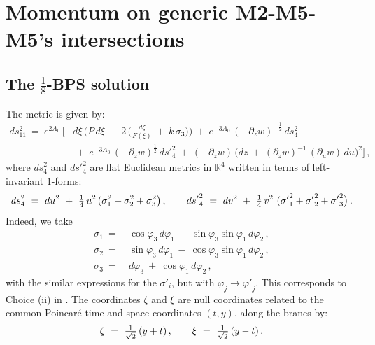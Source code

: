 \documentclass[11pt]{article}
\def\coeff#1#2{\relax{\textstyle \frac{#1}{#2}}\displaystyle}
\def\IR{\mathbb{R}}
\def\nca{{\zeta}}
\def\ncb{{\xi}}
\def\nBPS#1{$\frac{1}{#1}$-BPS}
\numberwithin{equation}{section}
\begin{document}
\section{Momentum on generic M2-M5-M5's intersections}
\label{sec:3dSugr}

\subsection{The \nBPS{8} solution}
\label{ss:4susysolution}


The metric is given by:
%
\begin{equation}
\begin{aligned}
ds_{11}^2 ~=~  e^{2  A_0}\, \bigg[ &  d \ncb \, \bigg( P \,  d  \ncb    ~+~ 2\, \bigg( \frac{ d \nca}{F(\ncb) } ~+~ k \,  \sigma_3  \bigg)\bigg)~+~ e^{-3  A_0} \, (-\partial_z w )^{-\frac{1}{2}}\, ds_4^2 \\ & ~+~ e^{-3  A_0} \, (-\partial_z w )^{\frac{1}{2}}\,  {ds'}_4^2
 ~+~  (-\partial_z w ) \, \big( dz ~+~(\partial_z w )^{-1}\,  (\partial_u w ) \, d u \big)^2  \bigg]\,,
\end{aligned}
 \label{11metric}
\end{equation}
%
where  ${ds}_4^2$ and ${ds'}_4^2$ are flat Euclidean metrics in $\IR^4$ written in terms of left-invariant $1$-forms: 
%
\begin{equation}
 ds_{4}^2 ~=~     du^2  ~+~ \coeff{1}{4} \, u^2 \, (\sigma_1^2 +\sigma_2^2+ \sigma_3^2 \big)  \,, \qquad {ds'}_4^2  ~=~  dv^2  ~+~ \coeff{1}{4} \, v^2 \, \,({\sigma'}_1^2 +{\sigma'}_2^2+{\sigma'}_3^2\big) \,.
 \label{4metrics}
\end{equation}
%
Indeed, we take 
%
\begin{equation}
\begin{aligned}
\sigma_1 ~=~  &   \cos \varphi_3 \, d \varphi_1 ~+~ \sin \varphi_3 \sin \varphi_1\, d \varphi_2  \,, \\ 
\sigma_2 ~=~  &   \sin \varphi_3 \, d \varphi_1 ~-~ \cos \varphi_3 \sin \varphi_1\, d \varphi_2  \,, \\ 
\sigma_3 ~=~  &    d \varphi_3 ~+~ \cos  \varphi_1\, d \varphi_2  \,,
\end{aligned}
 \label{1forms}
\end{equation}
%
with the similar expressions for the ${\sigma'}_i$, but with $\varphi_j \to {\varphi'}_j$.   This corresponds to  Choice (ii)  in \cite{Bena:2024qed}.  The coordinates $\nca$ and $\ncb$ are null coordinates related to the common Poincar\'e time and space coordinates $(t,y)$, along the branes by:
%
\begin{equation}
\nca ~=~ \coeff{1}{\sqrt{2}} \, (y+t) \,, \qquad \ncb ~=~ \coeff{1}{\sqrt{2}} \, (y-t) \,.
 \label{tynull}
\end{equation}
%
\end{document}
